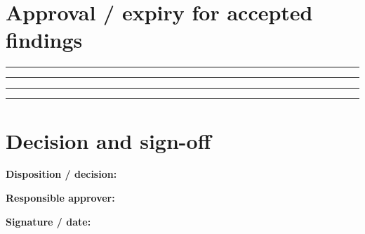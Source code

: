 \documentclass[10pt,letterpaper]{article}
\begin{document}
\section{Approval / expiry for accepted findings}
\noindent\rule{\linewidth}{0.4pt}\par\vspace{16pt}
\noindent\rule{\linewidth}{0.4pt}\par\vspace{16pt}
\noindent\rule{\linewidth}{0.4pt}\par\vspace{16pt}
\noindent\rule{\linewidth}{0.4pt}\par\vspace{16pt}
\section{Decision and sign-off}
\noindent\textbf{Disposition / decision:}\quad\hrulefill\par\vspace{11pt}
\noindent\textbf{Responsible approver:}\quad\hrulefill\par\vspace{11pt}
\noindent\textbf{Signature / date:}\quad\hrulefill\par\vspace{11pt}
\end{document}
